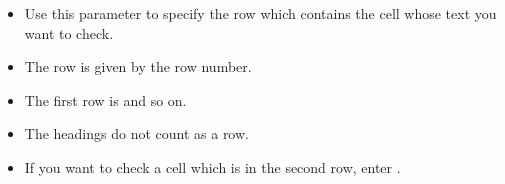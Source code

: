    \begin{itemize}
\item Use this parameter to specify the row which contains the cell whose text you want to check.
\item The row is given by the row number.
\item The first row is  and so on.
\item The headings do not count as a row. 
\item If you want to check a cell which is in the second row, enter . 
\end{itemize}    
